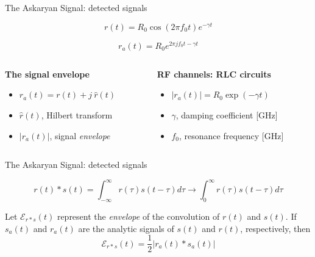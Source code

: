 \documentclass{beamer}
\begin{document}
\begin{frame}{The Askaryan Signal: detected signals}
\begin{tcolorbox}[colback=box_background,colframe=box_frame,title={Common response function for RF channels $r(t)$, [m ns$^{-1}$]}]
\begin{equation}
r(t) = R_0 \cos(2\pi f_0 t) e^{-\gamma t}
\end{equation}
\end{tcolorbox}
\begin{tcolorbox}[colback=box_background,colframe=box_frame,title={Common analytic signal for RF channels $r_a(t)$, [m ns$^{-1}$]}]
\begin{equation}
r_a(t) = R_0 e^{2\pi j f_0 t-\gamma t}
\end{equation}
\end{tcolorbox}
\footnotesize
\begin{columns}[T]
\begin{column}{0.49\textwidth}
\textbf{The signal envelope}
\begin{itemize}
\item $r_a(t) = r(t) + j ~ \widehat{r}(t)$
\item $\widehat{r}(t)$, Hilbert transform
\item $|r_a(t)|$, signal \textit{envelope}
\end{itemize}
\end{column}
\begin{column}{0.49\textwidth}
\textbf{RF channels: RLC circuits}
\begin{itemize}
\item $|r_a(t)| = R_0\exp(-\gamma t)$
\item $\gamma$, damping coefficient [GHz]
\item $f_0$, resonance frequency [GHz]
\end{itemize}
\end{column}
\end{columns}
\end{frame}

\begin{frame}{The Askaryan Signal: detected signals}
\begin{tcolorbox}[colback=box_background,colframe=box_frame,title={Detected signals, $r(t) * s(t)$, [V]}]
\begin{equation}
r(t) * s(t) = \int_{-\infty}^{\infty} r(\tau) s(t-\tau) d\tau \rightarrow \int_{0}^{\infty} r(\tau) s(t-\tau) d\tau
\end{equation}
\end{tcolorbox}
\begin{tcolorbox}[colback=box_background,colframe=box_frame,title=Theorem: the envelope of detected signal]
Let $\mathcal{E}_{r * s}(t)$ represent the \textit{envelope} of the convolution of $r(t)$ and $s(t)$.  If $s_a(t)$ and $r_a(t)$ are the analytic signals of $s(t)$ and $r(t)$, respectively, then
\begin{equation}
\mathcal{E}_{r*s}(t) = \frac{1}{2}|r_a(t) * s_a(t)|
\end{equation}
\end{tcolorbox}
\end{frame}
\end{document}
